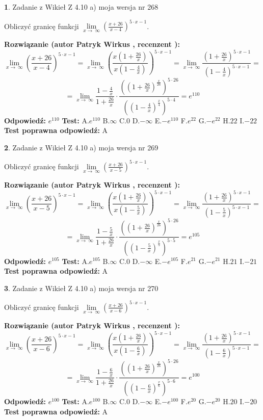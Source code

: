 \documentclass[12pt, a4paper]{article}
\theoremstyle{definition} %
\newtheorem{zad}{}
\newcommand{\zadStart}[1]{\begin{zad}#1\newline}
\newcommand{\zadStop}{\end{zad}}
\newcommand{\rozwStart}[2]{\noindent \textbf{Rozwiązanie (autor #1 , recenzent #2): }\newline}
\newcommand{\rozwStop}{\newline}
\newcommand{\odpStart}{\noindent \textbf{Odpowiedź:}\newline}
\newcommand{\odpStop}{\newline}
\newcommand{\testStart}{\noindent \textbf{Test:}\newline}
\newcommand{\testStop}{\newline}
\newcommand{\kluczStart}{\noindent \textbf{Test poprawna odpowiedź:}\newline}
\newcommand{\kluczStop}{\newline}
\begin{document}
\zadStart{Zadanie z Wikieł Z 4.10 a) moja wersja nr 268}

Obliczyć granicę funkcji  $\lim\limits_{x\to\ \infty}(\frac{x+26}{x-4})^{5\cdot x-1}$.
\zadStop
\rozwStart{Patryk Wirkus}{}
$$\lim\limits_{x\to\ \infty}(\frac{x+26}{x-4})^{5\cdot x-1} = \lim\limits_{x\to\ \infty}(\frac{x(1+\frac{26}{x})}{x(1-\frac{4}{x})})^{5\cdot x-1}=\lim\limits_{x\to\ \infty}\frac{(1+\frac{26}{x})^{5\cdot x-1}}{(1-\frac{4}{x})^{5\cdot x-1}}=$$
$$=\lim\limits_{x\to\ \infty}\frac{1-\frac{4}{x}}{1+\frac{26}{x}}\cdot\frac{((1+\frac{26}{x})^{\frac{x}{26}})^{5\cdot26}}{((1-\frac{4}{x})^{\frac{x}{4}})^{5\cdot4}}=e^{110}$$
\rozwStop
\odpStart
$e^{110}$
\odpStop
\testStart
A.$e^{110}$ B.$\infty$ C.$0$ D.$-\infty$ E.$-e^{110}$
F.$e^{22}$ G.$-e^{22}$
H.$22$
I.$-22$
\testStop
\kluczStart
A
\kluczStop



\zadStart{Zadanie z Wikieł Z 4.10 a) moja wersja nr 269}

Obliczyć granicę funkcji  $\lim\limits_{x\to\ \infty}(\frac{x+26}{x-5})^{5\cdot x-1}$.
\zadStop
\rozwStart{Patryk Wirkus}{}
$$\lim\limits_{x\to\ \infty}(\frac{x+26}{x-5})^{5\cdot x-1} = \lim\limits_{x\to\ \infty}(\frac{x(1+\frac{26}{x})}{x(1-\frac{5}{x})})^{5\cdot x-1}=\lim\limits_{x\to\ \infty}\frac{(1+\frac{26}{x})^{5\cdot x-1}}{(1-\frac{5}{x})^{5\cdot x-1}}=$$
$$=\lim\limits_{x\to\ \infty}\frac{1-\frac{5}{x}}{1+\frac{26}{x}}\cdot\frac{((1+\frac{26}{x})^{\frac{x}{26}})^{5\cdot26}}{((1-\frac{5}{x})^{\frac{x}{5}})^{5\cdot5}}=e^{105}$$
\rozwStop
\odpStart
$e^{105}$
\odpStop
\testStart
A.$e^{105}$ B.$\infty$ C.$0$ D.$-\infty$ E.$-e^{105}$
F.$e^{21}$ G.$-e^{21}$
H.$21$
I.$-21$
\testStop
\kluczStart
A
\kluczStop



\zadStart{Zadanie z Wikieł Z 4.10 a) moja wersja nr 270}

Obliczyć granicę funkcji  $\lim\limits_{x\to\ \infty}(\frac{x+26}{x-6})^{5\cdot x-1}$.
\zadStop
\rozwStart{Patryk Wirkus}{}
$$\lim\limits_{x\to\ \infty}(\frac{x+26}{x-6})^{5\cdot x-1} = \lim\limits_{x\to\ \infty}(\frac{x(1+\frac{26}{x})}{x(1-\frac{6}{x})})^{5\cdot x-1}=\lim\limits_{x\to\ \infty}\frac{(1+\frac{26}{x})^{5\cdot x-1}}{(1-\frac{6}{x})^{5\cdot x-1}}=$$
$$=\lim\limits_{x\to\ \infty}\frac{1-\frac{6}{x}}{1+\frac{26}{x}}\cdot\frac{((1+\frac{26}{x})^{\frac{x}{26}})^{5\cdot26}}{((1-\frac{6}{x})^{\frac{x}{6}})^{5\cdot6}}=e^{100}$$
\rozwStop
\odpStart
$e^{100}$
\odpStop
\testStart
A.$e^{100}$ B.$\infty$ C.$0$ D.$-\infty$ E.$-e^{100}$
F.$e^{20}$ G.$-e^{20}$
H.$20$
I.$-20$
\testStop
\kluczStart
A
\kluczStop
\end{document}
